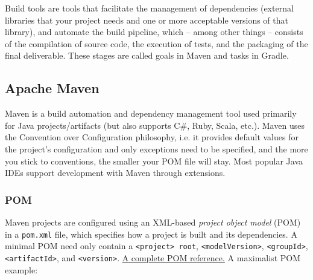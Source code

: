 \documentclass[table, xcdraw]{article}%
\begin{document}
Build tools are tools that facilitate the management of dependencies (external libraries that your project needs and one or more acceptable versions of that library), and automate the build pipeline, which -- among other things -- consists of the compilation of source code, the execution of tests, and the packaging of the final deliverable. These stages are called goals in Maven and tasks in Gradle.

\subsection{Apache Maven}

Maven is a build automation and dependency management tool used primarily for Java projects/artifacts (but also supports C\#, Ruby, Scala, etc.). Maven uses the Convention over Configuration philosophy, i.e. it provides default values for the project's configuration and only exceptions need to be specified, and the more you stick to conventions, the smaller your POM file will stay. Most popular Java IDEs support development with Maven through extensions.

\subsubsection{POM}

Maven projects are configured using an XML-based \emph{project object model} (POM) in a \texttt{pom.xml} file, which specifies how a project is built and its dependencies. A minimal POM need only contain a \texttt{<project> root}, \texttt{<modelVersion>}, \texttt{<groupId>}, \texttt{<artifactId>}, and \texttt{<version>}. \href{https://maven.apache.org/ref/3.9.6/maven-model/maven.html}{A complete POM reference.} A maximalist POM example:
\end{document}
